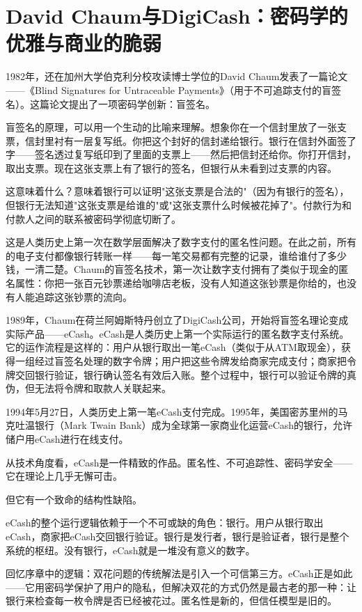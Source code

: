 \documentclass[a4paper,12pt,openany]{ctexbook}
\begin{document}
\section*{David Chaum与DigiCash：密码学的优雅与商业的脆弱}


1982年，还在加州大学伯克利分校攻读博士学位的David Chaum发表了一篇论文——《Blind Signatures for Untraceable Payments》（用于不可追踪支付的盲签名）。这篇论文提出了一项密码学创新：盲签名。

盲签名的原理，可以用一个生动的比喻来理解。想象你在一个信封里放了一张支票，信封里衬有一层复写纸。你把这个封好的信封递给银行。银行在信封外面签了字——签名透过复写纸印到了里面的支票上——然后把信封还给你。你打开信封，取出支票。现在这张支票上有了银行的签名，但银行从未看到过支票的内容。

这意味着什么？意味着银行可以证明"这张支票是合法的"（因为有银行的签名），但银行无法知道"这张支票是给谁的"或"这张支票什么时候被花掉了"。付款行为和付款人之间的联系被密码学彻底切断了。

这是人类历史上第一次在数学层面解决了数字支付的匿名性问题。在此之前，所有的电子支付都像银行转账一样——每一笔交易都有完整的记录，谁给谁付了多少钱，一清二楚。Chaum的盲签名技术，第一次让数字支付拥有了类似于现金的匿名属性：你把一张百元钞票递给咖啡店老板，没有人知道这张钞票是你给的，也没有人能追踪这张钞票的流向。

1989年，Chaum在荷兰阿姆斯特丹创立了DigiCash公司，开始将盲签名理论变成实际产品——eCash。eCash是人类历史上第一个实际运行的匿名数字支付系统。它的运作流程是这样的：用户从银行取出一笔eCash（类似于从ATM取现金），获得一组经过盲签名处理的数字令牌；用户把这些令牌发给商家完成支付；商家把令牌交回银行验证，银行确认签名有效后入账。整个过程中，银行可以验证令牌的真伪，但无法将令牌和取款人关联起来。

1994年5月27日，人类历史上第一笔eCash支付完成。1995年，美国密苏里州的马克吐温银行（Mark Twain Bank）成为全球第一家商业化运营eCash的银行，允许储户用eCash进行在线支付。

从技术角度看，eCash是一件精致的作品。匿名性、不可追踪性、密码学安全——它在理论上几乎无懈可击。

但它有一个致命的结构性缺陷。

eCash的整个运行逻辑依赖于一个不可或缺的角色：银行。用户从银行取出eCash，商家把eCash交回银行验证。银行是发行者，银行是验证者，银行是整个系统的枢纽。没有银行，eCash就是一堆没有意义的数字。

回忆序章中的逻辑：双花问题的传统解法是引入一个可信第三方。eCash正是如此——它用密码学保护了用户的隐私，但解决双花的方式仍然是最古老的那一种：让银行来检查每一枚令牌是否已经被花过。匿名性是新的，但信任模型是旧的。
\end{document}
